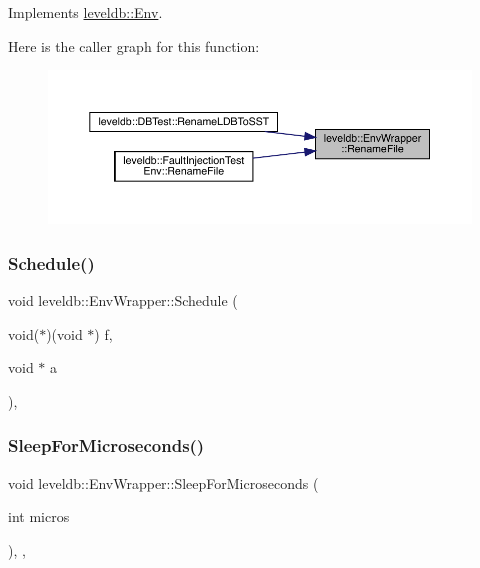 Implements \mbox{\hyperlink{classleveldb_1_1_env_abd743b3d4751ada1ab307427827ed5b0}{leveldb\+::\+Env}}.

Here is the caller graph for this function\+:
\nopagebreak
\begin{figure}[H]
\begin{center}
\leavevmode
\includegraphics[width=350pt]{classleveldb_1_1_env_wrapper_a242f2f6f35bd043ba6905a49704d20c9_icgraph}
\end{center}
\end{figure}
\mbox{\label{classleveldb_1_1_env_wrapper_a69668ef703abeb29742870dfe437955b}} 
\subsubsection{\texorpdfstring{Schedule()}{Schedule()}}
{\footnotesize\ttfamily void leveldb\+::\+Env\+Wrapper\+::\+Schedule (\begin{DoxyParamCaption}\item[{void($\ast$)(void $\ast$)}]{f,  }\item[{void $\ast$}]{a }\end{DoxyParamCaption})\hspace{0.3cm}{\ttfamily [inline]}, {\ttfamily [override]}}

\mbox{\label{classleveldb_1_1_env_wrapper_a2758834cf036084788c2504caebc5019}} 
\subsubsection{\texorpdfstring{SleepForMicroseconds()}{SleepForMicroseconds()}}
{\footnotesize\ttfamily void leveldb\+::\+Env\+Wrapper\+::\+Sleep\+For\+Microseconds (\begin{DoxyParamCaption}\item[{int}]{micros }\end{DoxyParamCaption})\hspace{0.3cm}{\ttfamily [inline]}, {\ttfamily [override]}, {\ttfamily [virtual]}}



